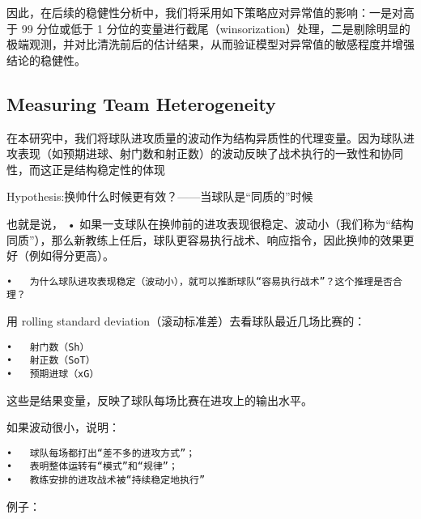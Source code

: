 \documentclass[
]{ctexart}
\begin{document}
因此，在后续的稳健性分析中，我们将采用如下策略应对异常值的影响：一是对高于
99 分位或低于 1
分位的变量进行截尾（winsorization）处理，二是剔除明显的极端观测，并对比清洗前后的估计结果，从而验证模型对异常值的敏感程度并增强结论的稳健性。

\subsection{Measuring Team
Heterogeneity}\label{measuring-team-heterogeneity}

在本研究中，我们将球队进攻质量的波动作为结构异质性的代理变量。因为球队进攻表现（如预期进球、射门数和射正数）的波动反映了战术执行的一致性和协同性，而这正是结构稳定性的体现

Hypothesis:换帅什么时候更有效？------当球队是``同质的''时候

也就是说， •
如果一支球队在换帅前的进攻表现很稳定、波动小（我们称为``结构同质''），那么新教练上任后，球队更容易执行战术、响应指令，因此换帅的效果更好（例如得分更高）。

\begin{verbatim}
•   为什么球队进攻表现稳定（波动小），就可以推断球队“容易执行战术”？这个推理是否合理？
\end{verbatim}

用 rolling standard deviation（滚动标准差）去看球队最近几场比赛的：

\begin{verbatim}
•   射门数（Sh）
•   射正数（SoT）
•   预期进球（xG）
\end{verbatim}

这些是结果变量，反映了球队每场比赛在进攻上的输出水平。

如果波动很小，说明：

\begin{verbatim}
•   球队每场都打出“差不多的进攻方式”；
•   表明整体运转有“模式”和“规律”；
•   教练安排的进攻战术被“持续稳定地执行”
\end{verbatim}

例子：
\end{document}
